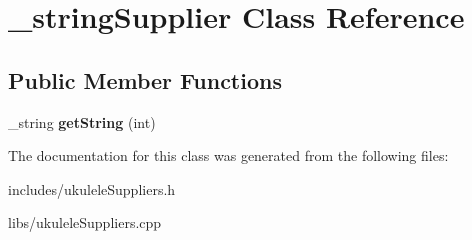 \hypertarget{class__string_supplier}{}\section{\+\_\+string\+Supplier Class Reference}
\label{class__string_supplier}
\subsection*{Public Member Functions}
\begin{DoxyCompactItemize}
\item 
\hypertarget{class__string_supplier_aa9d4feea4ce1ea39a86d87dafee306a1}{}\label{class__string_supplier_aa9d4feea4ce1ea39a86d87dafee306a1} 
\+\_\+string {\bfseries get\+String} (int)
\end{DoxyCompactItemize}


The documentation for this class was generated from the following files\+:\begin{DoxyCompactItemize}
\item 
includes/ukulele\+Suppliers.\+h\item 
libs/ukulele\+Suppliers.\+cpp\end{DoxyCompactItemize}
